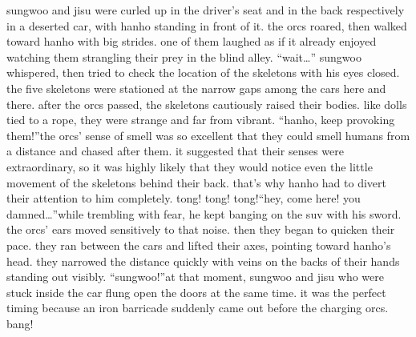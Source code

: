 sungwoo and jisu were curled up in the driver’s seat and in the back respectively in a deserted car, with hanho standing in front of it.
the orcs roared, then walked toward hanho with big strides.
one of them laughed as if it already enjoyed watching them strangling their prey in the blind alley.
“wait…” sungwoo whispered, then tried to check the location of the skeletons with his eyes closed.
 the five skeletons were stationed at the narrow gaps among the cars here and there.
after the orcs passed, the skeletons cautiously raised their bodies.
 like dolls tied to a rope, they were strange and far from vibrant.
“hanho, keep provoking them!”the orcs’ sense of smell was so excellent that they could smell humans from a distance and chased after them.
it suggested that their senses were extraordinary, so it was highly likely that they would notice even the little movement of the skeletons behind their back.
that’s why hanho had to divert their attention to him completely.
tong! tong! tong!“hey, come here! you damned…”while trembling with fear, he kept banging on the suv with his sword.
 the orcs’ ears moved sensitively to that noise.
 then they began to quicken their pace.
they ran between the cars and lifted their axes, pointing toward hanho’s head.
 they narrowed the distance quickly with veins on the backs of their hands standing out visibly.
“sungwoo!”at that moment, sungwoo and jisu who were stuck inside the car flung open the doors at the same time.
it was the perfect timing because an iron barricade suddenly came out before the charging orcs.
bang!

 